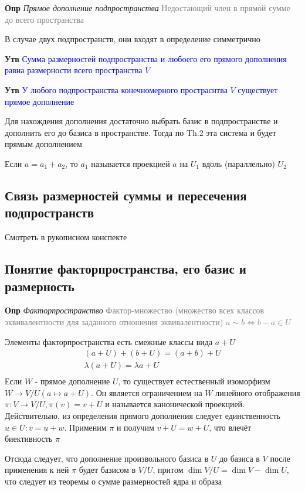 \textbf{Опр} \textit{Прямое дополнение подпространства} \textcolor{gray}{Недостающий член в прямой сумме до всего
пространства}

В случае двух подпространств, они входят в определение симметрично

\textbf{Утв} \textcolor{blue}{Сумма размерностей подпространства и любоего его прямого дополнения равна
размерности всего пространства $V$}

\textbf{Утв} \textcolor{blue}{У любого подпространства конечномерного простраснтва $V$ существует прямое дополнение}

Для нахождения дополнения достаточно выбрать базис в подпространстве и дополнить его до базиса в пространстве.
Тогда по Th.2 эта система и будет прямым дополнением

Если $a = a_1 + a_2$, то $a_1$ называется проекцией $a$ на $U_1$ вдоль (параллельно) $U_2$

\subsection{Связь размерностей суммы и пересечения подпространств}

Смотреть в рукописном конспекте

\subsection{Понятие факторпространства, его базис и размерность}

\textbf{Опр} \textit{Факторпространство} \textcolor{gray}{Фактор-множество (множество всех классов
эквивалентности для заданного отношения эквивалентности) $a \sim b \Leftrightarrow b - a \in U$}

Элементы факторпространства есть смежные классы вида $a + U$
\begin{gather*}
    (a + U) + (b + U) = (a + b) + U\\
    \lambda (a + U) = \lambda a + U\\
\end{gather*}
Если $W$ - прямое дополнение $U$, то существует естественный изоморфизм $W \rightarrow V/U (a \mapsto a + U)$.
Он является ограничением на $W$ линейного отображения $\pi: V \rightarrow V/U, \pi (v) = v + U$ и называется
канонической проекцией.
Действительно, из определения прямого дополнения следует единственность $u \in U: v = u + w$.
Применим $\pi$ и получим $v + U = w + U$, что влечёт биективность $\pi$

Отсюда следует, что дополнение произвольного базиса в $U$ до базиса в $V$ после применения к ней $\pi$ будет
базисом в $V/U$, притом $\dim V/U = \dim V - \dim U$, что следует из теоремы о сумме размерностей ядра и образа